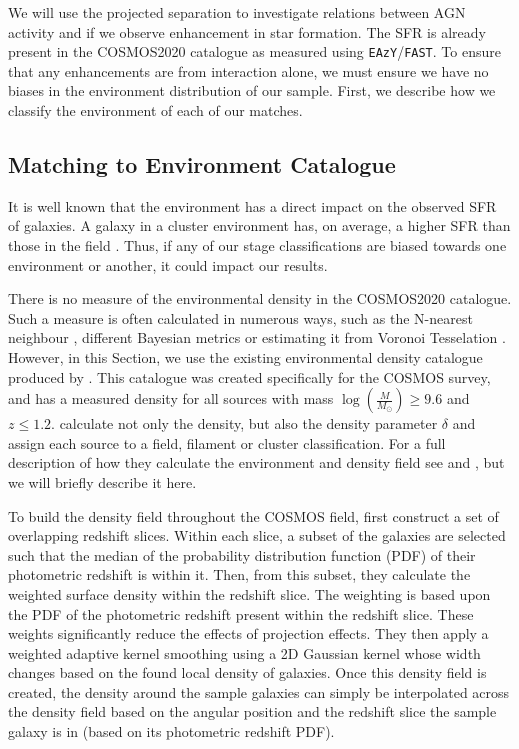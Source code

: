 We will use the projected separation to investigate relations between AGN activity and if we observe enhancement in star formation. The SFR is already present in the COSMOS2020 catalogue as measured using \texttt{EAzY}/\texttt{FAST}. To ensure that any enhancements are from interaction alone, we must ensure we have no biases in the environment distribution of our sample. First, we describe how we classify the environment of each of our matches.

\subsection{Matching to Environment Catalogue}\label{data:environ}
\noindent It is well known that the environment has a direct impact on the observed SFR of galaxies. A galaxy in a cluster environment has, on average, a higher SFR than those in the field \citep{2006MNRAS.373..469B}. Thus, if any of our stage classifications are biased towards one environment or another, it could impact our results.

There is no measure of the environmental density in the COSMOS2020 catalogue. Such a measure is often calculated in numerous ways, such as the N-nearest neighbour \citep{2006MNRAS.373..469B}, different Bayesian metrics \citep{2008ApJ...674L..13C} or estimating it from Voronoi Tesselation \citep{2021inas.book...57V}. However, in this Section, we use the existing environmental density catalogue produced by \citet{2017ApJ...837...16D}. This catalogue was created specifically for the COSMOS survey, and has a measured density for all sources with mass $\log(\frac{M}{M_\odot}) \geq 9.6$ and $z \leq 1.2$. \citet{2017ApJ...837...16D} calculate not only the density, but also the density parameter $\delta$ and assign each source to a field, filament or cluster classification. For a full description of how they calculate the environment and density field see \citet{2015ApJ...805..121D} and \citet{2017ApJ...837...16D}, but we will briefly describe it here.

To build the density field throughout the COSMOS field, \citet{2017ApJ...837...16D} first construct a set of overlapping redshift slices. Within each slice, a subset of the galaxies are selected such that the median of the probability distribution function (PDF) of their photometric redshift is within it. Then, from this subset, they calculate the weighted surface density within the redshift slice. The weighting is based upon the PDF of the photometric redshift present within the redshift slice. These weights significantly reduce the effects of projection effects. They then apply a weighted adaptive kernel smoothing using a 2D Gaussian kernel whose width changes based on the found local density of galaxies. Once this density field is created, the density around the sample galaxies can simply be interpolated across the density field based on the angular position and the redshift slice the sample galaxy is in (based on its photometric redshift PDF).

